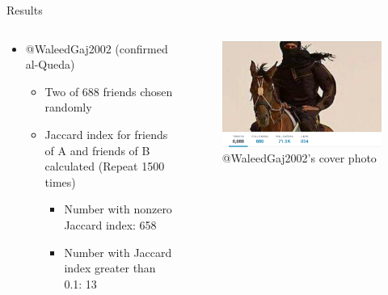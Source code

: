 \documentclass{beamer}
\begin{document}
\begin{frame}{Results}
\begin{columns}
        \begin{column}{0.5\textwidth}
            \begin{itemize}
\item @WaleedGaj2002 (confirmed al-Queda)
    \begin{itemize}
    \item Two of 688  friends chosen randomly
    \item Jaccard index for friends of A and friends of B calculated (Repeat 1500 times)
        \begin{itemize}
        \item Number with nonzero Jaccard index: 658
        \item Number with Jaccard index greater than 0.1: 13
        \end{itemize}
    \end{itemize}
\end{itemize}
        \end{column}
        \begin{column}{0.5\textwidth}
            \begin{figure}
            \centering
            \includegraphics[width=1\textwidth]{picture}
            \caption{@WaleedGaj2002's cover photo}
            \end{figure}
        \end{column}
    \end{columns}
\end{frame}
\end{document}
